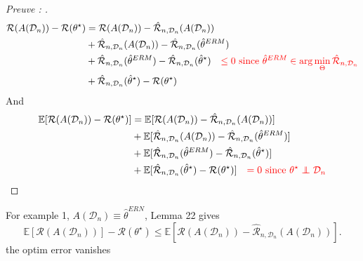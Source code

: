 \begin{proof}[Preuve : ]
    \begin{align*}
        \mathcal{R}(A(\mathcal{D}_n)) - \mathcal{R}(\theta ^\star ) &= \mathcal{R}(A(\mathcal{D}_n)) - \hat{\mathcal{R}} _{n, \mathcal{D}_n} (A (\mathcal{D}_n )) \\
        &+ \hat{\mathcal{R}} _{n, \mathcal{D}_n} (A (\mathcal{D}_n )) - \hat{\mathcal{R}} _{n, \mathcal{D}_n} (\hat{\theta }^{ERM}) \\
        &+ \hat{\mathcal{R}} _{n, \mathcal{D}_n} (\hat{\theta }^{ERM}) - \hat{\mathcal{R}} _{n, \mathcal{D}_n} (\hat{\theta }^{\star }) \quad \textcolor{red}{\leq 0 \text{ since } \hat{\theta }^{ERM} \in \arg \min _{\Theta } \hat{\mathcal{R}} _{n, \mathcal{D}_n}}\\
        &+ \hat{\mathcal{R}} _{n, \mathcal{D}_n} (\hat{\theta }^{\star }) - \mathcal{R}(\theta ^\star ) \\
    \end{align*}
    And 
    \begin{align*}
        \mathbb{E}[\mathcal{R}(A(\mathcal{D}_n)) - \mathcal{R}(\theta ^\star )] &= \mathbb{E}[\mathcal{R}(A(\mathcal{D}_n)) - \hat{\mathcal{R}} _{n, \mathcal{D}_n} (A (\mathcal{D}_n )) ] \\
        &+ \mathbb{E}[\hat{\mathcal{R}} _{n, \mathcal{D}_n} (A (\mathcal{D}_n )) - \hat{\mathcal{R}} _{n, \mathcal{D}_n} (\hat{\theta }^{ERM}) ] \\
        &+ \mathbb{E}[\hat{\mathcal{R}} _{n, \mathcal{D}_n} (\hat{\theta }^{ERM}) - \hat{\mathcal{R}} _{n, \mathcal{D}_n} (\hat{\theta }^{\star }) ] \\
        &+ \mathbb{E}[\hat{\mathcal{R}} _{n, \mathcal{D}_n} (\hat{\theta }^{\star }) - \mathcal{R}(\theta ^\star )] \quad \textcolor{red}{=0 \text{ since } \theta ^\star \perp\!\!\!\!\perp \mathcal{D}_n} \\
    \end{align*}
\end{proof}

\begin{note}[]
    For example 1, $ A(\mathcal{D}_n) \equiv \hat{\theta }^{ERN} $, Lemma 22 gives 
    \[
        \mathbb{E}[ \mathcal{R} (A (\mathcal{D}_n))] - \mathcal{R} (\theta ^\star ) \leq  \mathbb{E}[ \mathcal{R}(A(\mathcal{D}_n)) - \hat{\mathcal{R} } _{n, \mathcal{D}_n} ( A(\mathcal{D}_n)) ]
    .\]
    the optim error vanishes
\end{note}

